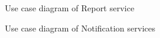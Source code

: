 \documentclass[12pt]{article}
\begin{document}
			\begin{figure}[H]
				\centering				
				\caption{Use case diagram of Report service}
			\end{figure}
			
			\begin{figure}[H]
				\centering				
				\caption{Use case diagram of Notification services}
			\end{figure}
			
\end{document}
